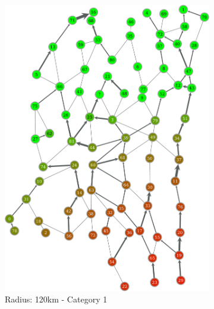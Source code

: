 \documentclass[titlepage]{article}
\begin{document}
\begin{figure}
\begin{subfigure}[b]{0.3\textwidth}
        \includegraphics[width=\textwidth]{figures/right_120_1-crop.pdf}
        \caption{Radius: 120km - Category 1}
        \label{fig:pop_county39}
      \end{subfigure}~
      \begin{subfigure}[b]{0.3\textwidth}
        \center

\end{subfigure}
\end{figure}
\end{document}
